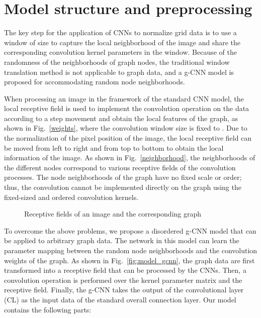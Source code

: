 \documentclass[11pt]{article}
\begin{document}
\section{Model structure and preprocessing}

The key step for the application of CNNs to normalize grid data is to use a window of size  to capture the local neighborhood of the image and share the corresponding convolution kernel parameters in the window. Because of the randomness of the neighborhoods of graph nodes, the traditional window translation method is not applicable to graph data, and a g-CNN model is proposed for accommodating random node neighborhoods.

When processing an image in the framework of the standard CNN model, the local receptive field is used to implement the convolution operation on the data according to a step movement and obtain the local features of the graph, as shown in Fig.~\ref{weights}, where the convolution window size is fixed to . Due to the normalization of the pixel position of the image, the local receptive field can be moved from left to right and from top to bottom to obtain the local information of the image. As shown in Fig.~\ref{neighborhood}, the neighborhoods of the different nodes correspond to various receptive fields of the convolution processes. The node neighborhoods of the graph have no fixed scale or order; thus, the convolution cannot be implemented directly on the graph using the fixed-sized and ordered convolution kernels.


\begin{figure}[!htbp]
\centering
{}
\caption{Receptive fields of an image and the corresponding graph}\label{fig:imagetograph}
\end{figure}




To overcome the above problems, we propose a disordered g-CNN model that can be applied to arbitrary graph data. The network in this model can learn the parameter mapping between the random node neighborhoods and the convolution weights of the graph. As shown in Fig.~\ref{fig:model_gcnn}, the graph data are first transformed into a receptive field that can be processed by the CNNs. Then, a convolution operation is performed over the kernel parameter matrix and the receptive field. Finally, the g-CNN takes the output of the convolutional layer (CL) as the input data of the standard overall connection layer. Our model contains the following parts:
\end{document}
